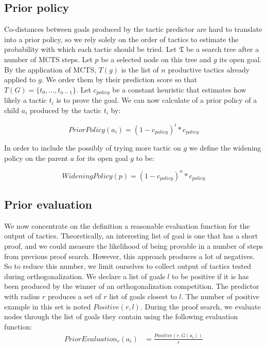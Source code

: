 \documentclass[runningheads,a4paper,draft]{svjour3}
\begin{document}
\subsection{Prior policy}\label{sec:policy}
Co-distances between goals produced by the tactic predictor are hard 
to translate into a prior policy, so we rely solely on the order of 
tactics to estimate the probability with which each tactic should be tried.
Let $\mathfrak{T}$ be a search tree after a number of MCTS steps.
Let $p$ be a selected node on this tree and $g$ its open goal. By the 
application of MCTS, $T(g)$ is the list of $n$ productive tactics already 
applied to $g$. We order them by their prediction score so that $T(G)= \lbrace 
t_0,\ldots,t_{n-1} \rbrace$. 
Let $c_{policy}$ be a constant heuristic that estimates how likely a tactic 
$t_i$ is to prove the goal. 
We can now calculate of a prior policy of a child $a_i$ produced by the tactic 
$t_i$ by:

\[PriorPolicy(a_i) = (1 - c_{policy})^{i} * c_{policy}\]

In order to include the possibly of trying more tactic on $g$ we define the 
widening policy on the parent $a$ for its open goal $g$ to be:

\[WideningPolicy(p) = (1 - c_{policy})^{n} * c_{policy}\]


\subsection{Prior evaluation}\label{sec:evaluation}

We now concentrate on the definition a reasonable evaluation function for the 
output of tactics. Theoretically, an interesting list of goal is one 
that has a short proof, and we could measure the likelihood of being 
provable in a number of steps from previous proof search. However, this 
approach produces a lot of negatives. So to reduce this number, we limit 
ourselves to collect output of tactics tested during orthogonalization. We 
declare a list of goals $l$ to be positive if it is has been produced by the 
winner of an orthogonalization competition. The predictor with radius $r$ 
 produces a set of $r$ list of goals closest to $l$. The 
number of positive example in this set is noted $Positive(r,l)$.
During the proof search, we evaluate nodes through the list of goals they 
contain using the following evaluation function:
\begin{align*}
PriorEvaluation_r (a_i) &= \frac{Positive(r,G(a_i))}{r}\\
\end{align*}
\end{document}

